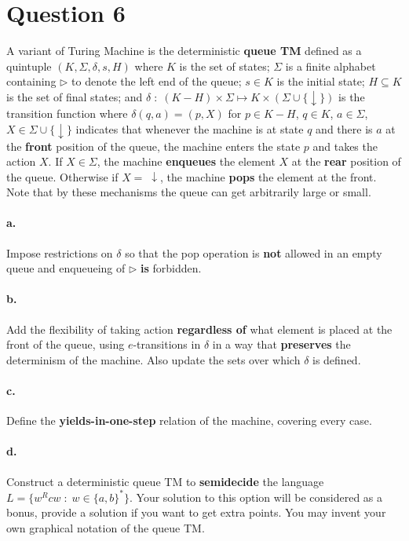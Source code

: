 \documentclass[fleqn,12pt]{article}
\begin{document}
\section*{Question 6 \hfill {}}
A variant of Turing Machine is the deterministic \textbf{queue TM} defined as a quintuple $(K, \Sigma, \delta, s, H)$ where $K$ is the set of states; $\Sigma$ is a finite alphabet containing $\triangleright$ to denote the left end of the queue; $s\in K$ is the initial state; $H\subseteq K$ is the set of final states; and $\delta\;:\;(K-H) \times \Sigma \mapsto K\times(\Sigma \cup \{\downarrow\})$ is the transition function where $\delta(q,a) = (p,X)$ for $p\in K-H$, $q\in K$, $a\in\Sigma$, $X\in\Sigma \cup \{\downarrow\}$ indicates that whenever the machine is at state $q$ and there is $a$ at the \textbf{front} position of the queue, the machine enters the state $p$ and takes the action $X$. If $X \in \Sigma$, the machine \textbf{enqueues} the element $X$ at the \textbf{rear} position of the queue. Otherwise if $X=\; \downarrow$, the machine \textbf{pops} the element at the front. Note that by these mechanisms the queue can get arbitrarily large or small.
\paragraph{a.} Impose restrictions on $\delta$ so that the pop operation is \textbf{not} allowed in an empty queue and enqueueing of $\triangleright$ \textbf{is} forbidden. \hfill {}
\paragraph{b.} Add the flexibility of taking action \textbf{regardless of} what element is placed at the front of the queue, using $e$-transitions in $\delta$ in a way that \textbf{preserves} the determinism of the machine. Also update the sets over which $\delta$ is defined. \hfill {}
\paragraph{c.} Define the \textbf{yields-in-one-step} relation of the machine, covering every case. \hfill {}
\paragraph{d.} Construct a deterministic queue TM to \textbf{semidecide} the language $L =\{w^Rcw\;:\; w\in\{a,b\}^*\}$.  Your solution to this option will be considered as a bonus, provide a solution if you want to get extra points. You may invent your own graphical notation of the queue TM. \hfill {}
\end{document}
